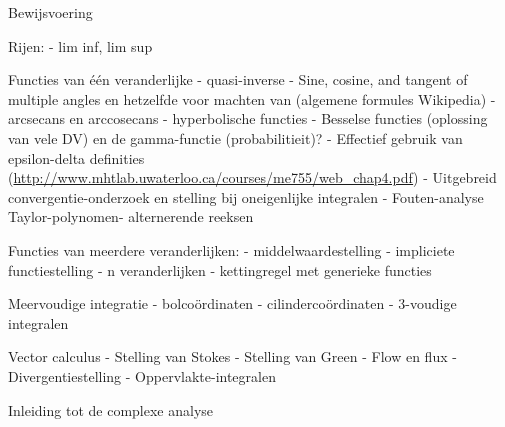Bewijsvoering

Rijen: 
- lim inf, lim sup


Functies van één veranderlijke
- quasi-inverse
 - Sine, cosine, and tangent of multiple angles en hetzelfde voor machten van (algemene formules Wikipedia)
 - arcsecans en arccosecans
 - hyperbolische functies
 - Besselse functies (oplossing van vele DV) en de gamma-functie (probabilitieit)?
 - Effectief gebruik van epsilon-delta definities (\url{http://www.mhtlab.uwaterloo.ca/courses/me755/web_chap4.pdf})
 - Uitgebreid convergentie-onderzoek en stelling bij oneigenlijke integralen
- Fouten-analyse Taylor-polynomen- alternerende reeksen
 
 
 Functies van meerdere veranderlijken:
- middelwaardestelling
- impliciete functiestelling
- n veranderlijken
- kettingregel met generieke functies


Meervoudige integratie
 - bolcoördinaten
 - cilindercoördinaten
 - 3-voudige integralen
 
 Vector calculus
 - Stelling van Stokes
 - Stelling van Green
 - Flow en flux
 - Divergentiestelling
 - Oppervlakte-integralen
 
 Inleiding tot de complexe analyse
 



